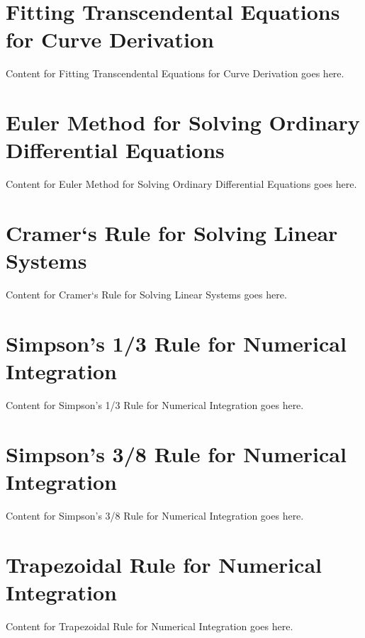 \documentclass{article}
\begin{document}
\section*{Fitting Transcendental Equations for Curve Derivation}
\setcounter{page}{6} %
Content for Fitting Transcendental Equations for Curve Derivation goes here.
\clearpage

\section*{Euler Method for Solving Ordinary Differential Equations}
\setcounter{page}{7} %
Content for Euler Method for Solving Ordinary Differential Equations goes here.
\clearpage

\section*{Cramer`s Rule for Solving Linear Systems}
\setcounter{page}{8} %
Content for Cramer`s Rule for Solving Linear Systems goes here.
\clearpage

\section*{Simpson's 1/3 Rule for Numerical Integration}
\setcounter{page}{10} %
Content for Simpson's 1/3 Rule for Numerical Integration goes here.
\clearpage

\section*{Simpson's 3/8 Rule for Numerical Integration}
\setcounter{page}{11} %
Content for Simpson's 3/8 Rule for Numerical Integration goes here.
\clearpage
\section*{Trapezoidal Rule for Numerical Integration}
\setcounter{page}{12} %
Content for Trapezoidal Rule for Numerical Integration goes here.
\clearpage
\end{document}
